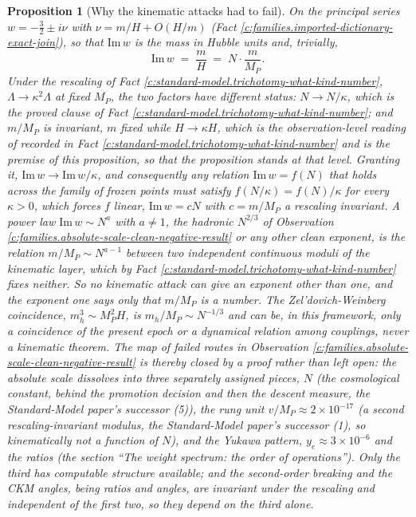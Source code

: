 \documentclass[11pt]{article}
\newtheorem{proposition}[theorem]{Proposition}
\theoremstyle{definition}
\theoremstyle{plain}
\begin{document}
\begin{proposition}[Why the kinematic attacks had to fail]\label{c:families.why-kinematic-attacks-had-fail}
On the principal series $w = -\tfrac32 \pm i\nu$ with $\nu = m/H + O(H/m)$ (Fact \ref{c:families.imported-dictionary-exact-join}), so that $\mathrm{Im}\,w$ is the mass in Hubble units and, trivially,
\[
\mathrm{Im}\,w \;=\; \frac{m}{H} \;=\; N \cdot \frac{m}{M_{P}} .
\]
Under the rescaling of Fact \ref{c:standard-model.trichotomy-what-kind-number}, $\Lambda \to \kappa^{2}\Lambda$ at fixed $M_{P}$, the two factors have different status: $N \to N/\kappa$, which is the proved clause of Fact \ref{c:standard-model.trichotomy-what-kind-number}; and $m/M_{P}$ is invariant, $m$ fixed while $H \to \kappa H$, which is the observation-level reading of \cite[Prop.~7.6(1)]{ButlerT12} recorded in Fact \ref{c:standard-model.trichotomy-what-kind-number} and is the premise of this proposition, so that the proposition stands at that level. Granting it, $\mathrm{Im}\,w \to \mathrm{Im}\,w/\kappa$, and consequently any relation $\mathrm{Im}\,w = f(N)$ that holds across the family of frozen points must satisfy $f(N/\kappa) = f(N)/\kappa$ for every $\kappa > 0$, which forces $f$ linear, $\mathrm{Im}\,w = cN$ with $c = m/M_{P}$ a rescaling invariant. A power law $\mathrm{Im}\,w \sim N^{a}$ with $a \neq 1$, the hadronic $N^{2/3}$ of Observation \ref{c:families.absolute-scale-clean-negative-result} or any other clean exponent, is the relation $m/M_{P} \sim N^{a - 1}$ between two independent continuous moduli of the kinematic layer, which by Fact \ref{c:standard-model.trichotomy-what-kind-number} fixes neither. So no kinematic attack can give an exponent other than one, and the exponent one says only that $m/M_{P}$ is a number. The Zel'dovich-Weinberg coincidence, $m_{h}^{3} \sim M_{P}^{2}H$, is $m_{h}/M_{P} \sim N^{-1/3}$ and can be, in this framework, only a coincidence of the present epoch or a dynamical relation among couplings, never a kinematic theorem. The map of failed routes in Observation \ref{c:families.absolute-scale-clean-negative-result} is thereby closed by a proof rather than left open: the absolute scale dissolves into three separately assigned pieces, $N$ (the cosmological constant, behind the promotion decision and then the descent measure, the Standard-Model paper's successor (5)), the rung unit $v/M_{P} \approx 2 \times 10^{-17}$ (a second rescaling-invariant modulus, the Standard-Model paper's successor (1), so kinematically not a function of $N$), and the Yukawa pattern, $y_{e} \approx 3 \times 10^{-6}$ and the ratios (the section ``The weight spectrum: the order of operations''). Only the third has computable structure available; and the second-order breaking and the CKM angles, being ratios and angles, are invariant under the rescaling and independent of the first two, so they depend on the third alone.
\end{proposition}
\end{document}
